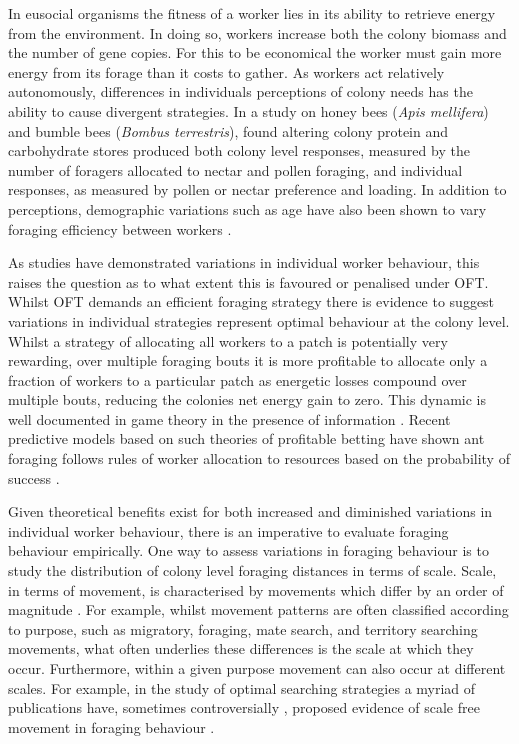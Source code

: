 \documentclass[11pt,usenames,dvipsnames]{article}
\begin{document}
In eusocial organisms the fitness of a worker lies in its ability to retrieve energy from the environment. In doing so, workers increase both the colony biomass and the number of gene copies. For this to be economical the worker must gain more energy from its forage than it costs to gather. As workers act relatively autonomously, differences in individuals perceptions of colony needs has the ability to cause divergent strategies. In a study on honey bees (\textit{Apis mellifera}) and bumble bees (\textit{Bombus terrestris}), \cite{Hendriksma2019} found altering colony protein and carbohydrate stores produced both colony level responses, measured by the number of foragers allocated to nectar and pollen foraging, and individual responses, as measured by pollen or nectar preference and loading. In addition to perceptions, demographic variations such as age have also been shown to vary foraging efficiency between workers \citep{Schippers2006, Klein2019}.

As studies have demonstrated variations in individual worker behaviour, this raises the question as to what extent this is favoured or penalised under OFT. Whilst OFT demands an efficient foraging strategy there is evidence to suggest variations in individual strategies represent optimal behaviour at the colony level. Whilst a strategy of allocating all workers to a patch is potentially very rewarding, over multiple foraging bouts it is more profitable to allocate only a fraction of workers to a particular patch as energetic losses compound over multiple bouts, reducing the colonies net energy gain to zero. This dynamic is well documented in game theory in the presence of information \citep{Kelly1956}. Recent predictive models based on such theories of profitable betting have shown ant foraging follows rules of worker allocation to resources based on the probability of success \citep{Baddeley2019}.

Given theoretical benefits exist for both increased and diminished variations in individual worker behaviour, there is an imperative to evaluate foraging behaviour empirically. One way to assess variations in foraging behaviour is to study the distribution of colony level foraging distances in terms of scale. Scale, in terms of movement, is characterised by movements which differ by an order of magnitude \citep{Levin1992}. For example, whilst movement patterns are often classified according to purpose, such as migratory, foraging, mate search, and territory searching movements, what often underlies these differences is the scale at which they occur. Furthermore, within a given purpose movement can also occur at different scales. For example, in the study of optimal searching strategies a myriad of publications have, sometimes controversially \citep{Viswanathan1996}, proposed evidence of scale free movement in foraging behaviour \citep{Harris2012, Ariel2015, Humphries2010, Baronchelli2013, Boyer, Ayala-Orozco2004, Sims2008, Viswanathan1999}.
\end{document}
